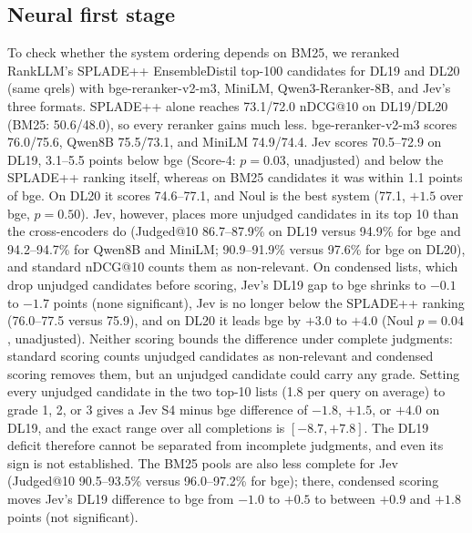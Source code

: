 





\subsection{Neural first stage}\label{app:first-stage}

To check whether the system ordering depends on BM25, we reranked RankLLM's SPLADE++ EnsembleDistil\cite{formal2022spladepp} top-100 candidates for DL19 and DL20 (same qrels) with bge-reranker-v2-m3, MiniLM, Qwen3-Reranker-8B, and Jev's three formats. SPLADE++ alone reaches 73.1/72.0 nDCG@10 on DL19/DL20 (BM25: 50.6/48.0), so every reranker gains much less. bge-reranker-v2-m3 scores 76.0/75.6, Qwen8B 75.5/73.1, and MiniLM 74.9/74.4. Jev scores 70.5--72.9 on DL19, 3.1--5.5 points below bge (Score-4: $p=0.03$, unadjusted) and below the SPLADE++ ranking itself, whereas on BM25 candidates it was within 1.1 points of bge. On DL20 it scores 74.6--77.1, and Noul is the best system (77.1, $+1.5$ over bge, $p=0.50$). Jev, however, places more unjudged candidates in its top 10 than the cross-encoders do (Judged@10 86.7--87.9\% on DL19 versus 94.9\% for bge and 94.2--94.7\% for Qwen8B and MiniLM; 90.9--91.9\% versus 97.6\% for bge on DL20), and standard nDCG@10 counts them as non-relevant. On condensed lists, which drop unjudged candidates before scoring\cite{sakai2007alternatives}, Jev's DL19 gap to bge shrinks to $-0.1$ to $-1.7$ points (none significant), Jev is no longer below the SPLADE++ ranking (76.0--77.5 versus 75.9), and on DL20 it leads bge by $+3.0$ to $+4.0$ (Noul $p=0.04$, unadjusted). Neither scoring bounds the difference under complete judgments: standard scoring counts unjudged candidates as non-relevant and condensed scoring removes them, but an unjudged candidate could carry any grade. Setting every unjudged candidate in the two top-10 lists (1.8 per query on average) to grade 1, 2, or 3 gives a Jev S4 minus bge difference of $-1.8$, $+1.5$, or $+4.0$ on DL19, and the exact range over all completions is $[-8.7,+7.8]$. The DL19 deficit therefore cannot be separated from incomplete judgments, and even its sign is not established. The BM25 pools are also less complete for Jev (Judged@10 90.5--93.5\% versus 96.0--97.2\% for bge); there, condensed scoring moves Jev's DL19 difference to bge from $-1.0$ to $+0.5$ to between $+0.9$ and $+1.8$ points (not significant).

